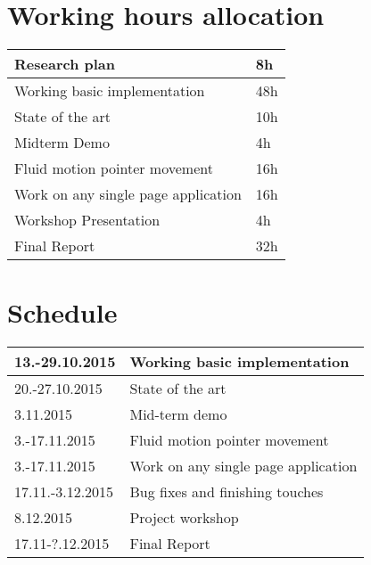 \documentclass[12pt,a4paper,english,oneside]{article}
\begin{document}
\section{Working hours allocation}

\begin{tabular}{|p{120mm}|p{30mm}|}
  \hline
  Research plan                       & 8h    \\ \hline
  Working basic implementation        & 48h   \\ \hline
  State of the art                    & 10h   \\ \hline
  Midterm Demo                        & 4h    \\ \hline
  Fluid motion pointer movement       & 16h   \\ \hline
  Work on any single page application & 16h   \\ \hline
  Workshop Presentation               & 4h    \\ \hline
  Final Report                        & 32h   \\ \hline
\end{tabular}

\section{Schedule}

\begin{tabular}{|p{30mm}|p{120mm}|}
  \hline
  13.-29.10.2015      & Working basic implementation \\ \hline
  20.-27.10.2015      & State of the art \\ \hline
  3.11.2015           & Mid-term demo \\ \hline
  3.-17.11.2015       & Fluid motion pointer movement \\ \hline
  3.-17.11.2015       & Work on any single page application \\ \hline
  17.11.-3.12.2015    & Bug fixes and finishing touches \\ \hline
  8.12.2015           & Project workshop \\ \hline
  17.11-?.12.2015     & Final Report \\ \hline
\end{tabular}






\end{document}
